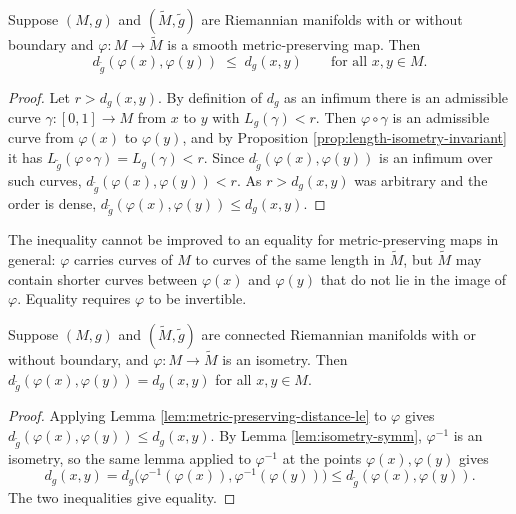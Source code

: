\begin{lemma}
\label{lem:metric-preserving-distance-le}
\leanok
{}
Suppose $(M,g)$ and $(\tilde{M},\tilde{g})$ are Riemannian manifolds with or without boundary and $\varphi : M \to \tilde{M}$ is a smooth metric-preserving map. Then
\[
  d_{\tilde{g}}(\varphi(x), \varphi(y)) \;\le\; d_g(x,y) \qquad \text{for all } x, y \in M.
\]
\end{lemma}

\begin{proof}
\leanok
{}
Let $r > d_g(x,y)$. By definition of $d_g$ as an infimum there is an admissible curve $\gamma : [0,1] \to M$ from $x$ to $y$ with $L_g(\gamma) < r$. Then $\varphi \circ \gamma$ is an admissible curve from $\varphi(x)$ to $\varphi(y)$, and by Proposition \ref{prop:length-isometry-invariant} it has $L_{\tilde{g}}(\varphi \circ \gamma) = L_g(\gamma) < r$. Since $d_{\tilde{g}}(\varphi(x),\varphi(y))$ is an infimum over such curves, $d_{\tilde{g}}(\varphi(x),\varphi(y)) < r$. As $r > d_g(x,y)$ was arbitrary and the order is dense, $d_{\tilde{g}}(\varphi(x),\varphi(y)) \le d_g(x,y)$.
\end{proof}

The inequality cannot be improved to an equality for metric-preserving maps in general: $\varphi$ carries curves of $M$ to curves of the same length in $\tilde{M}$, but $\tilde{M}$ may contain shorter curves between $\varphi(x)$ and $\varphi(y)$ that do not lie in the image of $\varphi$. Equality requires $\varphi$ to be invertible.

\begin{proposition}
\label{prop:isometry-invariance-riemannian-distance}
\leanok
{}

Suppose $(M, g)$ and $(\tilde{M}, \tilde{g})$ are connected Riemannian manifolds with or without boundary, and $\varphi: M \to \tilde{M}$ is an isometry. Then $d_{\tilde{g}}(\varphi(x), \varphi(y)) = d_g(x, y)$ for all $x, y \in M$.
\end{proposition}

\begin{proof}
\leanok
{}
Applying Lemma \ref{lem:metric-preserving-distance-le} to $\varphi$ gives $d_{\tilde{g}}(\varphi(x),\varphi(y)) \le d_g(x,y)$. By Lemma \ref{lem:isometry-symm}, $\varphi^{-1}$ is an isometry, so the same lemma applied to $\varphi^{-1}$ at the points $\varphi(x), \varphi(y)$ gives
\[
  d_g(x,y) = d_g\bigl(\varphi^{-1}(\varphi(x)), \varphi^{-1}(\varphi(y))\bigr) \le d_{\tilde{g}}(\varphi(x), \varphi(y)).
\]
The two inequalities give equality.
\end{proof}

